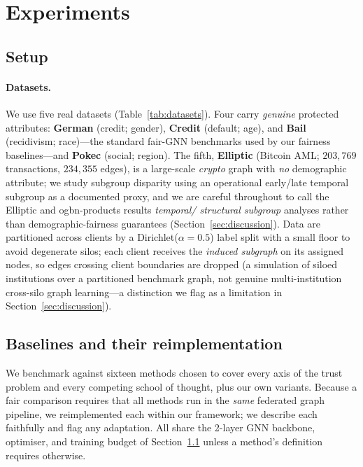 \documentclass[pdflatex,sn-mathphys-num]{sn-jnl}
\theoremstyle{thmstyleone}%
\theoremstyle{thmstyletwo}%
\theoremstyle{thmstylethree}%
\begin{document}
\section{Experiments}
\label{sec:experiments}

\subsection{Setup}
\label{sec:setup}
\paragraph{Datasets.}
We use five real datasets (Table~\ref{tab:datasets}). Four carry \emph{genuine}
protected attributes: \textbf{German} (credit; gender), \textbf{Credit}
(default; age), and \textbf{Bail} (recidivism; race)---the standard fair-GNN
benchmarks used by our fairness baselines---and \textbf{Pokec} (social; region).
The fifth, \textbf{Elliptic} (Bitcoin AML; $203{,}769$ transactions,
$234{,}355$ edges), is a large-scale \emph{crypto} graph with \emph{no}
demographic attribute; we study subgroup disparity using an operational
early/late temporal subgroup as a documented proxy, and we are careful
throughout to call the Elliptic and ogbn-products results \emph{temporal/
structural subgroup} analyses rather than demographic-fairness guarantees
(Section~\ref{sec:discussion}). Data are partitioned across clients by a
Dirichlet($\alpha{=}0.5$) label split with a small floor to avoid degenerate
silos; each client receives the \emph{induced subgraph} on its assigned nodes,
so edges crossing client boundaries are dropped (a simulation of siloed
institutions over a partitioned benchmark graph, not genuine multi-institution
cross-silo graph learning---a distinction we flag as a limitation in
Section~\ref{sec:discussion}).

\begin{table}[t]\centering\small
\caption{Datasets. $^\dagger$Elliptic uses an operational early/late temporal
subgroup as a documented proxy (not a protected demographic).}
\label{tab:datasets}

\end{table}

\subsection{Baselines and their reimplementation}
\label{sec:baselines}
We benchmark against sixteen methods chosen to cover every axis of the trust
problem and every competing school of thought, plus our own variants. Because a
fair comparison requires that all methods run in the \emph{same} federated
graph pipeline, we reimplemented each within our framework; we describe each
faithfully and flag any adaptation. All share the 2-layer GNN backbone,
optimiser, and training budget of Section~\ref{sec:setup} unless a method's
definition requires otherwise.
\end{document}
